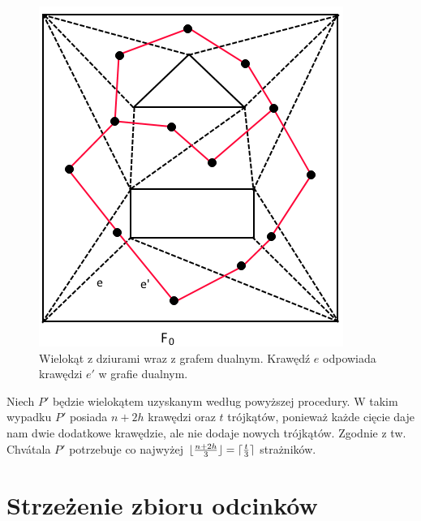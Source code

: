 \documentclass[brudnopis]{xmgr}
\DeclarePairedDelimiter\ceil{\lceil}{\rceil}
\DeclarePairedDelimiter\floor{\lfloor}{\rfloor}
\theoremstyle{definition}
\begin{document}
\begin{figure}[h!]
  \centering
    \includegraphics{rysunki/triangulacja_dziury.png}
    \caption{Wielokąt z dziurami wraz z grafem dualnym. Krawędź $e$ odpowiada krawędzi $e'$ w grafie dualnym.}
    \label{fig:triangulacja}
\end{figure} 

\indent Niech $P'$ będzie wielokątem uzyskanym według powyższej procedury. W takim wypadku $P'$ posiada $n + 2h$ krawędzi oraz $t$ trójkątów, ponieważ każde cięcie daje nam dwie dodatkowe krawędzie, ale nie dodaje nowych trójkątów. Zgodnie z tw. Chv\'atala $P'$ potrzebuje co najwyżej $\floor{\frac{n+2h}{3}} = \ceil{\frac{t}{3}}$ strażników.

\chapter{Strzeżenie zbioru odcinków}
\end{document}
